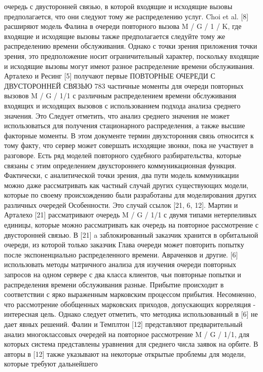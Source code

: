 очередь с двусторонней связью, в которой входящие и исходящие вызовы
предполагается, что они следуют тому же распределению услуг. Choi et al. [8] расширяют модель Фалина
в очереди повторного вызова M / G / 1 / K, где входящие и исходящие вызовы также предполагается
следуйте тому же распределению времени обслуживания. Однако с точки зрения приложения
точки зрения, это предположение носит ограничительный характер, поскольку входящие и исходящие вызовы могут
имеют разное распределение времени обслуживания. Арталехо и Ресинг [5] получают первые
ПОВТОРНЫЕ ОЧЕРЕДИ С ДВУСТОРОННЕЙ СВЯЗЬЮ 783
частичные моменты для очереди повторных вызовов M / G / 1/1 с различным распределением времени обслуживания входящих и исходящих вызовов с использованием подхода анализа среднего значения. Это
Следует отметить, что анализ среднего значения не может использоваться для получения стационарного
распределения, а также высшие факторные моменты.
В этом документе термин двухсторонняя связь относится к тому факту, что сервер
может совершать исходящие звонки, пока не участвует в разговоре. Есть
ряд моделей повторного судебного разбирательства, которые связаны с этим определением двухстороннего
коммуникационная функция. Фактически, с аналитической точки зрения, два пути
модель коммуникации можно даже рассматривать как частный случай других существующих
модели, которые по своему происхождению были разработаны для моделирования других различных очередей
Особенности. Это случай ссылок [21, 6, 12].
Мартин и Арталехо [21] рассматривают очередь M / G / 1/1 с двумя типами нетерпеливых
единицы, которые можно рассматривать как очередь на повторное рассмотрение с двусторонней связью. В [21] a
заблокированный заказчик хранится в орбитальной очереди, из которой только заказчик
Глава очереди может повторить попытку после экспоненциально распределенного времени. Авраченков
и другие. [6] использовать методы матричного анализа для изучения очереди повторных запросов на одном сервере с
два класса клиентов, чьи повторные попытки и распределения времени обслуживания
разные. Прибытие происходит в соответствии с ярко выраженным марковским процессом прибытия.
Несомненно, что рассмотрение обобщенных марковских приходов, допускающих
корреляция - интересная цель. Однако следует отметить, что методика
использованный в [6] не дает явных решений. Фалин и Темплтон [12] представляют
предварительный анализ многоклассовых очередей на повторное рассмотрение M / G / 1/1, для которых система
представлены уравнения для среднего числа заявок на орбите. В
авторы в [12] также указывают на некоторые открытые проблемы для модели, которые требуют дальнейшего
